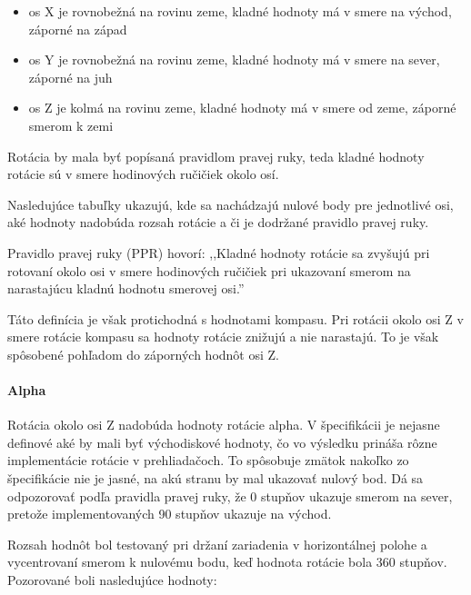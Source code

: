 \begin{itemize}
  \item os X je rovnobežná na rovinu zeme, kladné hodnoty má v smere na východ, záporné na západ
  \item os Y je rovnobežná na rovinu zeme, kladné hodnoty má v smere na sever, záporné na juh
  \item os Z je kolmá na rovinu zeme, kladné hodnoty má v smere od zeme, záporné smerom k zemi
\end{itemize}

Rotácia by mala byť popísaná pravidlom pravej ruky, teda kladné hodnoty rotácie sú v smere hodinových ručičiek okolo osí.

Nasledujúce tabuľky ukazujú, kde sa nachádzajú nulové body pre jednotlivé osi, aké hodnoty nadobúda rozsah rotácie a či je dodržané pravidlo pravej ruky.

Pravidlo pravej ruky (PPR) hovorí: ,,Kladné hodnoty rotácie sa zvyšujú pri rotovaní okolo osi v smere hodinových ručičiek pri ukazovaní smerom na narastajúcu kladnú hodnotu smerovej osi.''

Táto definícia je však protichodná s hodnotami kompasu. Pri rotácii okolo osi Z v smere rotácie kompasu sa hodnoty rotácie znižujú a nie narastajú. To je však spôsobené pohľadom do záporných hodnôt osi Z.


\paragraph{Alpha} %
\label{par:alpha}

Rotácia okolo osi Z nadobúda hodnoty rotácie alpha. V špecifikácii je nejasne definové aké by mali byť východiskové hodnoty, čo vo výsledku prináša rôzne implementácie rotácie v prehliadačoch. To spôsobuje zmätok nakoľko zo špecifikácie nie je jasné, na akú stranu by mal ukazovať nulový bod. Dá sa odpozorovať podľa pravidla pravej ruky, že 0 stupňov ukazuje smerom na sever, pretože implementovaných 90 stupňov ukazuje na východ.

Rozsah hodnôt bol testovaný pri držaní zariadenia v horizontálnej polohe a vycentrovaní smerom k nulovému bodu, keď hodnota rotácie bola 360 stupňov. Pozorované boli nasledujúce hodnoty:

